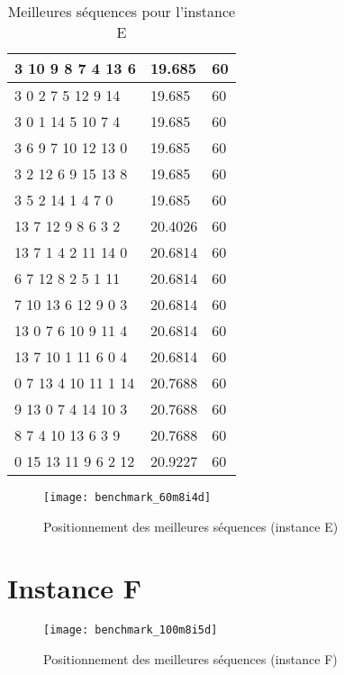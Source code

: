 \begin{table}[H]
\begin{tabular}{|l|l|l|}
		3 10 9 8 7 4 13 6    & 19.685  & 60      \\ \hline
		3 0 2 7 5 12 9 14    & 19.685  & 60      \\ \hline
		3 0 1 14 5 10 7 4    & 19.685  & 60      \\ \hline
		3 6 9 7 10 12 13 0   & 19.685  & 60      \\ \hline
		3 2 12 6 9 15 13 8   & 19.685  & 60      \\ \hline
		3 5 2 14 1 4 7 0     & 19.685  & 60      \\ \hline
		13 7 12 9 8 6 3 2    & 20.4026 & 60      \\ \hline
		13 7 1 4 2 11 14 0   & 20.6814 & 60      \\ \hline
		6 7 12 8 2 5 1 11    & 20.6814 & 60      \\ \hline
		7 10 13 6 12 9 0 3   & 20.6814 & 60      \\ \hline
		13 0 7 6 10 9 11 4   & 20.6814 & 60      \\ \hline
		13 7 10 1 11 6 0 4   & 20.6814 & 60      \\ \hline
		0 7 13 4 10 11 1 14  & 20.7688 & 60      \\ \hline
		9 13 0 7 4 14 10 3   & 20.7688 & 60      \\ \hline
		8 7 4 10 13 6 3 9    & 20.7688 & 60      \\ \hline
		0 15 13 11 9 6 2 12  & 20.9227 & 60      \\ \hline
		\end{tabular}
		\caption{Meilleures séquences pour l'instance E}
		\label{tab:best-seq-instanceE}
	\end{table}

	\begin{figure}[H]
		\centering
		\texttt{[image: benchmark\_60m8i4d]}
		\caption{Positionnement des meilleures séquences (instance E)}
		\label{fig:best-seq-instanceE}
	\end{figure}


	\section*{Instance F}
	\begin{figure}[H]
		\centering
		\texttt{[image: benchmark\_100m8i5d]}
		\caption{Positionnement des meilleures séquences (instance F)}
		\label{fig:best-seq-instanceF}
	\end{figure}


